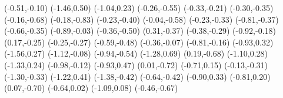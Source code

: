 \psdot[](-0.51,-0.10)
\psdot[](-1.46,0.50)
\psdot[](-1.04,0.23)
\psdot[](-0.26,-0.55)
\psdot[](-0.33,-0.21)
\psdot[](-0.30,-0.35)
\psdot[](-0.16,-0.68)
\psdot[](-0.18,-0.83)
\psdot[](-0.23,-0.40)
\psdot[](-0.04,-0.58)
\psdot[](-0.23,-0.33)
\psdot[](-0.81,-0.37)
\psdot[](-0.66,-0.35)
\psdot[](-0.89,-0.03)
\psdot[](-0.36,-0.50)
\psdot[](0.31,-0.37)
\psdot[](-0.38,-0.29)
\psdot[](-0.92,-0.18)
\psdot[](0.17,-0.25)
\psdot[](-0.25,-0.27)
\psdot[](-0.59,-0.48)
\psdot[](-0.36,-0.07)
\psdot[](-0.81,-0.16)
\psdot[](-0.93,0.32)
\psdot[](-1.56,0.27)
\psdot[](-1.12,-0.08)
\psdot[](-0.94,-0.54)
\psdot[](-1.28,0.69)
\psdot[](0.19,-0.68)
\psdot[](-1.10,0.28)
\psdot[](-1.33,0.24)
\psdot[](-0.98,-0.12)
\psdot[](-0.93,0.47)
\psdot[](0.01,-0.72)
\psdot[](-0.71,0.15)
\psdot[](-0.13,-0.31)
\psdot[](-1.30,-0.33)
\psdot[](-1.22,0.41)
\psdot[](-1.38,-0.42)
\psdot[](-0.64,-0.42)
\psdot[](-0.90,0.33)
\psdot[](-0.81,0.20)
\psdot[](0.07,-0.70)
\psdot[](-0.64,0.02)
\psdot[](-1.09,0.08)
\psdot[](-0.46,-0.67)
